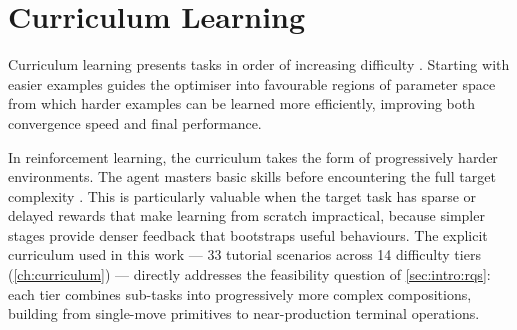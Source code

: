 \section{Curriculum Learning}
\label{sec:bg:curriculum}

Curriculum learning presents tasks in order of increasing difficulty \cite{bengio2009curriculum}. Starting with easier examples guides the optimiser into favourable regions of parameter space from which harder examples can be learned more efficiently, improving both convergence speed and final performance.

In reinforcement learning, the curriculum takes the form of progressively harder environments. The agent masters basic skills before encountering the full target complexity \cite{bengio2009curriculum}. This is particularly valuable when the target task has sparse or delayed rewards that make learning from scratch impractical, because simpler stages provide denser feedback that bootstraps useful behaviours. The explicit curriculum used in this work --- 33 tutorial scenarios across 14 difficulty tiers (\cref{ch:curriculum}) --- directly addresses the feasibility question of \cref{sec:intro:rqs}: each tier combines sub-tasks into progressively more complex compositions, building from single-move primitives to near-production terminal operations.
